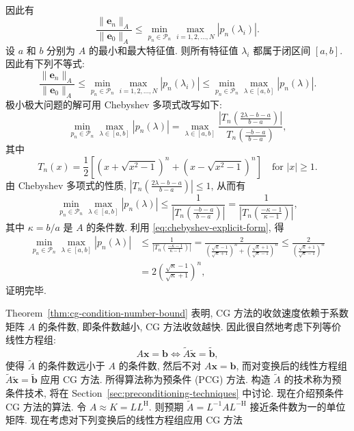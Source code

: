 \begin{Proof}
\[\begin{aligned}
\end{aligned}\]
{因此有}
\[\frac{\|\bm e_n\|_A}{\|\bm e_0\|_A}\le\min_{p_n\in\mathcal P_n}\max_{i=1,2,\ldots,N}|p_n(\lambda_i)|.\]
{设 $a$ 和 $b$ 分别为 $A$ 的最小和最大特征值. 则所有特征值 $\lambda_i$ 都属于闭区间 $[a,b]$. 因此有下列不等式:}
\[\frac{\|\bm e_n\|_A}{\|\bm e_0\|_A}\le\min_{p_n\in\mathcal P_n}\max_{i=1,2,\ldots,N}|p_n(\lambda_i)|\le\min_{p_n\in\mathcal P_n}\max_{\lambda\in[a,b]}|p_n(\lambda)|.\]
{极小极大问题的解可用 Chebyshev 多项式改写如下:}
\[\min_{p_n\in\mathcal P_n}\max_{\lambda\in[a,b]}|p_n(\lambda)|=\max_{\lambda\in[a,b]}\frac{|T_n(\frac{2\lambda-b-a}{b-a})|}{T_n(\frac{-b-a}{b-a})},\]
{其中}
\begin{equation}\label{eq:chebyshev-explicit-form}
T_n(x)=\frac12\left[\left(x+\sqrt{x^2-1}\right)^n+\left(x-\sqrt{x^2-1}\right)^n\right]\quad\text{for }|x|\ge1.
\end{equation}
{由 Chebyshev 多项式的性质, $|T_n(\frac{2\lambda-b-a}{b-a})|\le1$, 从而有}
\[\min_{p_n\in\mathcal P_n}\max_{\lambda\in[a,b]}|p_n(\lambda)|\le\frac1{|T_n(\frac{-b-a}{b-a})|}=\frac1{|T_n(\frac{-\kappa-1}{\kappa-1})|},\]
{其中 $\kappa=b/a$ 是 $A$ 的条件数. 利用 \eqref{eq:chebyshev-explicit-form}, 得}
\[\begin{aligned}
\min_{p_n\in\mathcal P_n}\max_{\lambda\in[a,b]}|p_n(\lambda)|&\le\frac1{|T_n(\frac{-\kappa-1}{\kappa-1})|}
=\frac2{\left(\frac{\sqrt\kappa-1}{\sqrt\kappa+1}\right)^n+\left(\frac{\sqrt\kappa+1}{\sqrt\kappa-1}\right)^n}
\le\frac2{\left(\frac{\sqrt\kappa+1}{\sqrt\kappa-1}\right)^n}\\
&=2\left(\frac{\sqrt\kappa-1}{\sqrt\kappa+1}\right)^n,
\end{aligned}\]
{证明完毕.}\end{Proof}
{\leavevmode{}\label{idx:chapter-03-section-01:cg-preconditioning-transformation}Theorem\ \ref{thm:cg-condition-number-bound} 表明, CG 方法的收敛速度依赖于系数矩阵 $A$ 的条件数, 即条件数越小, CG 方法收敛越快. 因此很自然地考虑下列等价线性方程组:}
\[A\bm x=\bm b\Leftrightarrow\widetilde A\widetilde{\bm x}=\widetilde{\bm b},\]
{使得 $\widetilde A$ 的条件数远小于 $A$ 的条件数, 然后不对 $A\bm x=\bm b$, 而对变换后的线性方程组 $\widetilde A\widetilde{\bm x}=\widetilde{\bm b}$ 应用 CG 方法. 所得算法称为预条件 (PCG) 方法. 构造 $\widetilde A$ 的技术称为预条件技术, 将在 Section\ \ref{sec:preconditioning-techniques} 中讨论.}
{现在介绍预条件 CG 方法的算法. 令 $A\approx K=LL^{\mathrm H}$. 则预期 $\widetilde A=L^{-1}AL^{-\mathrm H}$ 接近条件数为一的单位矩阵. 现在考虑对下列变换后的线性方程组应用 CG 方法}
